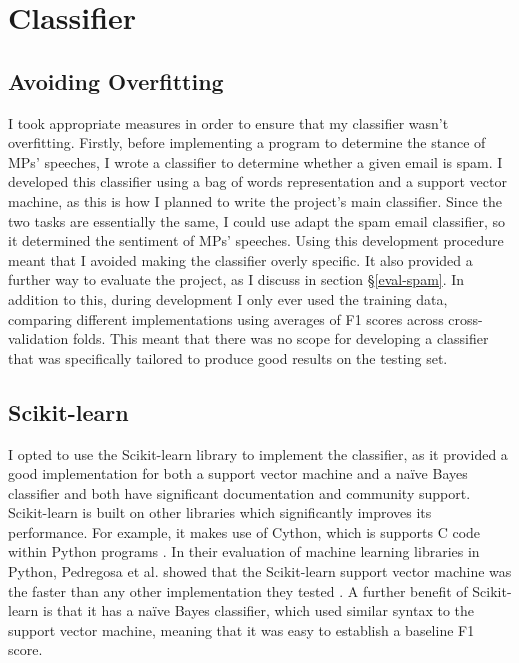 \documentclass[12pt,a4paper,twoside,openright]{report}
\begin{document}
\section{Classifier} \label{impl-classifier}

\subsection{Avoiding Overfitting} \label{impl-overfitting}

I took appropriate measures in order to ensure that my classifier wasn't overfitting. Firstly, before implementing a program to determine the stance of MPs' speeches, I wrote a classifier to determine whether a given email is spam. I developed this classifier using a bag of words representation and a support vector machine, as this is how I planned to write the project's main classifier. Since the two tasks are essentially the same, I could use adapt the spam email classifier, so it determined the sentiment of MPs' speeches. Using this development procedure meant that I avoided making the classifier overly specific. It also provided a further way to evaluate the project, as I discuss in section \S\ref{eval-spam}. In addition to this, during development I only ever used the training data, comparing different implementations using averages of F1 scores across cross-validation folds. This meant that there was no scope for developing a classifier that was specifically tailored to produce good results on the testing set.

\subsection{Scikit-learn}

I opted to use the Scikit-learn library to implement the classifier, as it provided a good implementation for both a support vector machine and a na\"{i}ve Bayes classifier and both have significant documentation \cite{nbcdocs, svmdocs} and community support. Scikit-learn is built on other libraries which significantly improves its performance. For example, it makes use of Cython, which is supports C code within Python programs \cite{cythondocs}. In their evaluation of machine learning libraries in Python, Pedregosa et al. showed that the Scikit-learn support vector machine was the faster than any other implementation they tested \cite{skspeed}. A further benefit of Scikit-learn is that it has a na\"{i}ve Bayes classifier, which used similar syntax to the support vector machine, meaning that it was easy to establish a baseline F1 score.
\end{document}
